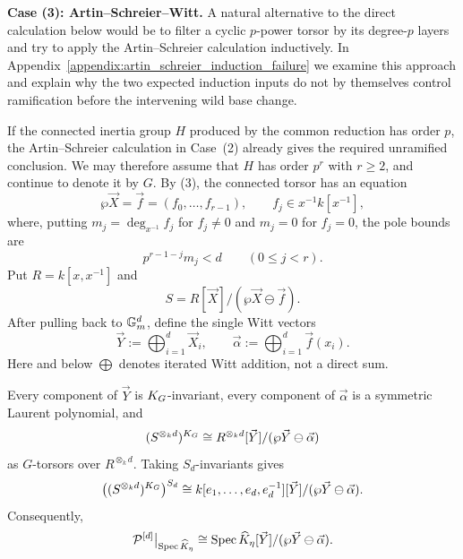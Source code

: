 \medskip
\noindent\textbf{Case (3): Artin--Schreier--Witt.}
A natural alternative to the direct calculation below would be to filter a
cyclic $p$-power torsor by its degree-$p$ layers and try to apply the
Artin--Schreier calculation inductively. In
Appendix~\ref{appendix:artin_schreier_induction_failure} we examine this approach and
explain why the two expected induction inputs do not by themselves control
ramification before the intervening wild base change.

If the connected inertia group $H$ produced by the common reduction has order
$p$, the Artin--Schreier calculation in Case~(2) already gives the required
unramified conclusion. We may therefore assume that $H$ has order $p^r$ with
$r\geq2$, and continue to denote it by $G$.
By (3), the connected torsor has an equation
\[
    \wp\vec X=\vec f=(f_0,\dots,f_{r-1}),
    \qquad f_j\in x^{-1}k[x^{-1}],
\]
where, putting $m_j=\deg_{x^{-1}}f_j$ for $f_j\neq0$ and $m_j=0$ for
$f_j=0$, the pole bounds are
\begin{equation}\label{eq:witt_pole_bound_in_calculation}
    p^{r-1-j}m_j<d\qquad(0\leq j<r).
\end{equation}
Put $R=k[x,x^{-1}]$ and
\[
    S=R[\vec X]/(\wp\vec X\ominus\vec f).
\]
After pulling back to $\mathbb{G}_m^d$, define the single Witt vectors
\[
    \vec Y:=\bigoplus_{i=1}^d\vec X_i,
    \qquad
    \vec\alpha:=\bigoplus_{i=1}^d\vec f(x_i).
\]
Here and below $\bigoplus$ denotes iterated Witt addition, not a direct sum.

\begin{prop}
\label{prop:witt_cover_identification}
Every component of $\vec Y$ is $K_{G}$-invariant, every component of
$\vec\alpha$ is a symmetric Laurent polynomial, and
\[
    (S^{\otimes_k d})^{K_{G}}
       \cong
    R^{\otimes_k d}[\vec Y]/(\wp\vec Y\ominus\vec\alpha)
\]
as $G$-torsors over $R^{\otimes_k d}$. Taking $S_d$-invariants gives
\[
    \bigl((S^{\otimes_k d})^{K_{G}}\bigr)^{S_d}
       \cong
    k[e_1,\dots,e_d,e_d^{-1}][\vec Y]
       /(\wp\vec Y\ominus\vec\alpha).
\]
Consequently,
\[
    \mathcal{P}^{[d]}\big|_{\operatorname{Spec}\widehat K_\eta}
       \cong
    \operatorname{Spec}\widehat K_\eta[\vec Y]
       /(\wp\vec Y\ominus\vec\alpha).
\]
\end{prop}


